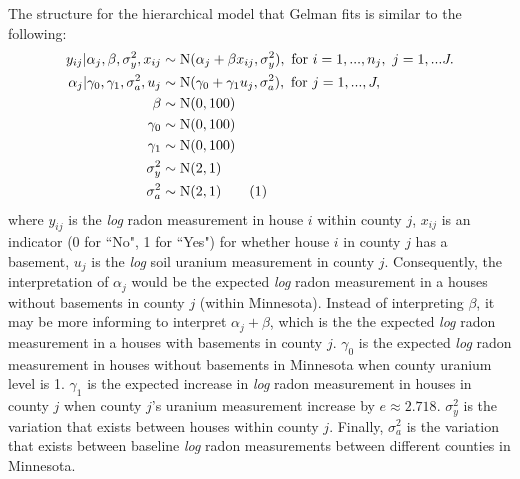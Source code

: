 \documentclass{article}
\newcommand\numberthis{\addtocounter{equation}{1}\tag{\theequation}}
\begin{document}
\noindent
The structure for the hierarchical model that Gelman fits is similar to the
following:
\begin{align*}
  y_{ij}|\alpha_j,\beta,\sigma_y^2,x_{ij} &\sim \text{N}(\alpha_j + \beta
      x_{ij},\sigma_y^2),\text{ for }i=1,...,n_j,~j=1,...J.\\
  \alpha_{j}|\gamma_0,\gamma_1,\sigma_a^2,u_j &\sim \text{N}(\gamma_0 +
      \gamma_1 u_j,\sigma_a^2),\text{ for }j=1,...,J,\\
  \beta &\sim \text{N}(0,100) \\
  \gamma_0 &\sim \text{N}(0,100)\\
  \gamma_1 &\sim \text{N}(0,100)\\
  \sigma_y^2 &\sim \text{N}(2,1)\\
  \sigma_a^2 &\sim \text{N}(2,1) \numberthis
\end{align*}
where $y_{ij}$ is the \textit{log} radon measurement in house $i$ within county
$j$, $x_{ij}$ is an indicator (0 for ``No", 1 for ``Yes") for whether house $i$
in county $j$ has a basement, $u_j$ is the \textit{log} soil uranium
measurement in county $j$. Consequently, the interpretation of $\alpha_j$ would
be the expected \textit{log} radon measurement in a houses without basements in
county $j$ (within Minnesota). Instead of interpreting $\beta$, it may be more
informing to interpret $\alpha_j+\beta$, which is the the expected \textit{log}
radon measurement in a houses with basements in county $j$. $\gamma_0$ is the
expected \textit{log} radon measurement in houses without basements in
Minnesota when county uranium level is 1. $\gamma_1$ is the expected increase
in \textit{log} radon measurement in houses in county $j$ when county $j$'s
uranium measurement increase by $e\approx 2.718$. $\sigma_y^2$ is the variation
that exists between houses within county $j$. Finally, $\sigma_a^2$ is the
variation that exists between baseline \textit{log} radon measurements between
different counties in Minnesota.\\
\end{document}

